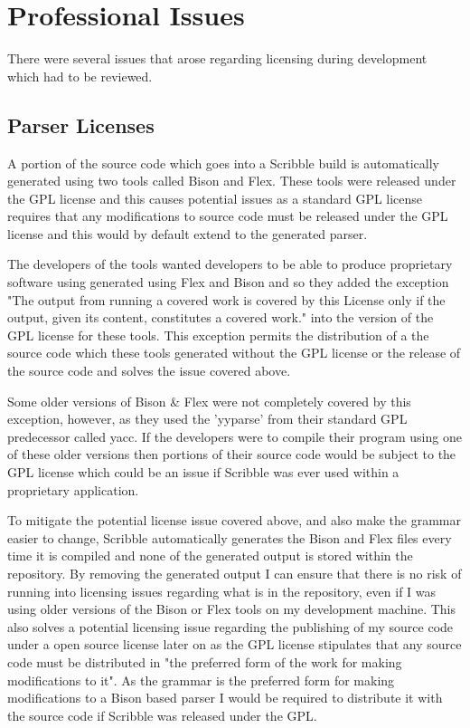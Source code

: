 \documentclass[]{final_report}
\begin{document}
\chapter{Professional Issues}

There were several issues that arose regarding licensing during development which had to be reviewed.

\section{Parser Licenses}

A portion of the source code which goes into a Scribble build is automatically generated using two tools called Bison and Flex. These tools were released under the GPL license and this causes potential issues as a standard GPL license requires that any modifications to source code must be released under the GPL license and this would by default extend to the generated parser.

The developers of the tools wanted developers to be able to produce proprietary software using generated using Flex and Bison and so they added the exception "The output from running a covered work is covered by this License only if the output, given its content, constitutes a covered work." into the version of the GPL license for these tools. This exception permits the distribution of a the source code which these tools generated without the GPL license or the release of the source code and solves the issue covered above\cite{BISONGPL}.

Some older versions of Bison \& Flex were not completely covered by this exception, however, as they used the 'yyparse' from their standard GPL predecessor called yacc. If the developers were to compile their program using one of these older versions then portions of their source code would be subject to the GPL license which could be an issue if Scribble was ever used within a proprietary application.

To mitigate the potential license issue covered above, and also make the grammar easier to change, Scribble automatically generates the Bison and Flex files every time it is compiled and none of the generated output is stored within the repository. By removing the generated output I can ensure that there is no risk of running into licensing issues regarding what is in the repository, even if I was using older versions of the Bison or Flex tools on my development machine. This also solves a potential licensing issue regarding the publishing of my source code under a open source license later on as the GPL license stipulates that any source code must be distributed in "the preferred form of the work for making modifications to it". As the grammar is the preferred form for making modifications to a Bison based parser I would be required to distribute it with the source code if Scribble was released under the GPL.
\end{document}
